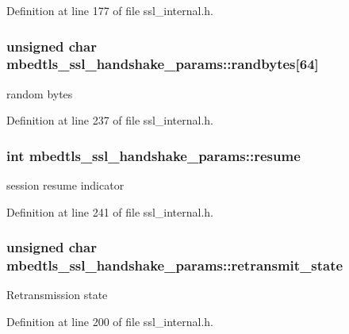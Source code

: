 Definition at line 177 of file ssl\-\_\-internal.\-h.

\hypertarget{structmbedtls__ssl__handshake__params_a7ccdd41754ab6c0ae3b7d1b3090ed1a5}{
\subsubsection[{randbytes}]{\setlength{\rightskip}{0pt plus 5cm}unsigned char mbedtls\-\_\-ssl\-\_\-handshake\-\_\-params\-::randbytes\mbox{[}64\mbox{]}}}\label{structmbedtls__ssl__handshake__params_a7ccdd41754ab6c0ae3b7d1b3090ed1a5}
random bytes 

Definition at line 237 of file ssl\-\_\-internal.\-h.

\hypertarget{structmbedtls__ssl__handshake__params_a2cb07171af1e3ed74fa45e795d063ba3}{
\subsubsection[{resume}]{\setlength{\rightskip}{0pt plus 5cm}int mbedtls\-\_\-ssl\-\_\-handshake\-\_\-params\-::resume}}\label{structmbedtls__ssl__handshake__params_a2cb07171af1e3ed74fa45e795d063ba3}
session resume indicator 

Definition at line 241 of file ssl\-\_\-internal.\-h.

\hypertarget{structmbedtls__ssl__handshake__params_a86a5f7294fa563413f5ae5421628a8da}{
\subsubsection[{retransmit\-\_\-state}]{\setlength{\rightskip}{0pt plus 5cm}unsigned char mbedtls\-\_\-ssl\-\_\-handshake\-\_\-params\-::retransmit\-\_\-state}}\label{structmbedtls__ssl__handshake__params_a86a5f7294fa563413f5ae5421628a8da}
Retransmission state 

Definition at line 200 of file ssl\-\_\-internal.\-h.

